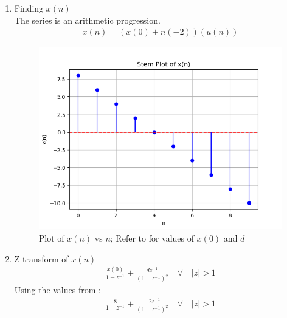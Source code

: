 \documentclass[journal,12pt,twocolumn]{IEEEtran}
\theoremstyle{remark}
\begin{document}
\begin{enumerate}
\item Finding $x(n)$ \\
The series is an arithmetic progression.
\begin{align}
x(n) = (x(0) + n(-2))(u(n))
\end{align}
\begin{figure}[h!]
    \centering
    \includegraphics[width=\columnwidth]{figs/xn.png}
    \caption{Plot of $x(n)$ vs $n$; Refer to  for values of $x(0)$ and $d$}
    \label{fig:1}
\end{figure}
\item Z-transform of $x(n)$ \\
\begin{align}
\frac{x(0)}{1 - z^{-1}} + \frac{dz^{-1}}{(1 - z^{-1})^2} \quad \forall \quad |z| > 1
\end{align}
Using the values from :
\begin{align}
\frac{8}{1 - z^{-1}} + \frac{-2z^{-1}}{(1 - z^{-1})^2} \quad \forall \quad |z| > 1
\end{align}
\end{enumerate}
\end{document}
